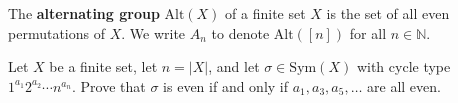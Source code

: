 \todo{}

\begin{definition}
The \textbf{alternating group} $\mathrm{Alt}(X)$ of a finite set $X$ is the set of all even permutations of $X$. We write $A_n$ to denote $\mathrm{Alt}([n])$ for all $n \in \mathbb{N}$.
\end{definition}

\todo{}

\begin{exercise}
Let $X$ be a finite set, let $n = |X|$, and let $\sigma \in \mathrm{Sym}(X)$ with cycle type $1^{a_1} 2^{a_2} \cdots n^{a_n}$. Prove that $\sigma$ is even if and only if $a_1, a_3, a_5, \dots$ are all even.
\end{exercise}